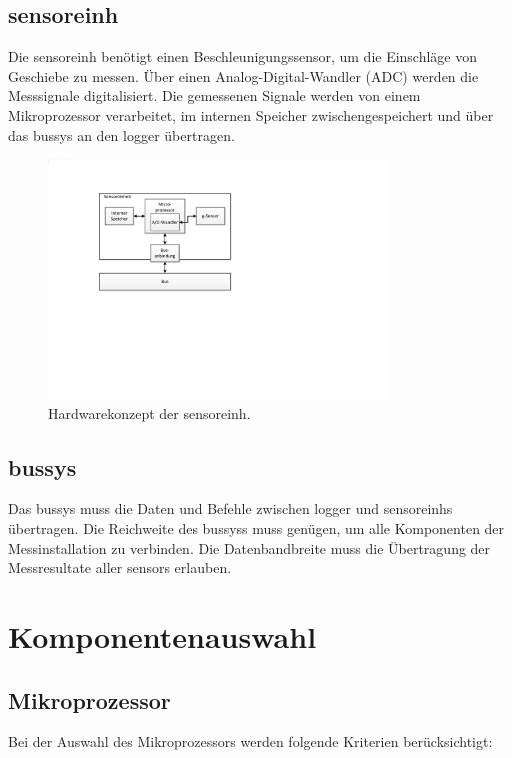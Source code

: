 \subsection{\gls{sensoreinh}}
Die \gls{sensoreinh} benötigt einen Beschleunigungssensor, um die Einschläge von Geschiebe zu messen. Über einen Analog-Digital-Wandler (ADC) werden die Messsignale digitalisiert. Die gemessenen Signale werden von einem Mikroprozessor verarbeitet, im internen Speicher zwischengespeichert und über das \gls{bussys} an den \gls{logger} übertragen.

\begin{figure}[H]
	\centering
		\includegraphics[width=0.8\textwidth]{images/visio/hardwarekonzept_sensor.pdf}
	\caption{Hardwarekonzept der \gls{sensoreinh}.}
	\label{fig.hwkonzept_sensor}
\end{figure}

\subsection{\gls{bussys}}
Das \gls{bussys} muss die Daten und Befehle zwischen \gls{logger} und \glspl{sensoreinh} übertragen. Die Reichweite des \gls{bussys}s muss genügen, um alle Komponenten der Messinstallation zu verbinden. Die Datenbandbreite muss die Übertragung der Messresultate aller \glspl{sensor} erlauben.


\section{Komponentenauswahl}

\subsection{Mikroprozessor}
Bei der Auswahl des Mikroprozessors werden folgende Kriterien berücksichtigt:

